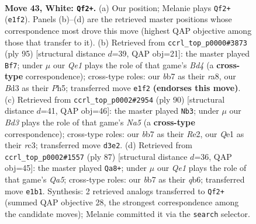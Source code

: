 \documentclass[11pt]{article}
\begin{document}
\clearpage

\begin{figure}[p]\centering
\begin{subfigure}{0.46\textwidth}\centering
\resizebox{\linewidth}{!}{%
\newchessgame
\chessboard[
  setfen={5r2/1b3k2/8/8/7p/3B3P/1p4P1/4Q1KR w - - 1 43},
  showmover=false,
  pgfstyle=straightmove, color=movearrow, markmove={e1-f2}
]}
\caption{}
\end{subfigure}\hfill
\begin{subfigure}{0.46\textwidth}\centering
\resizebox{\linewidth}{!}{%
\newchessgame
\chessboard[
  setfen={R7/8/p1r3k1/1p1b3p/8/P4P2/6PK/B7 b - - 13 48},
  showmover=false,
  pgfstyle=straightmove, color=movearrow, markmove={d5-f7}
]}
\caption{}
\end{subfigure}
\\[4pt]
\begin{subfigure}{0.46\textwidth}\centering
\resizebox{\linewidth}{!}{%
\newchessgame
\chessboard[
  setfen={8/4k3/4p1p1/N7/5bP1/2r2P2/P3RK2/8 w - - 3 46},
  showmover=false,
  pgfstyle=straightmove, color=movearrow, markmove={a5-b3}
]}
\caption{}
\end{subfigure}\hfill
\begin{subfigure}{0.46\textwidth}\centering
\resizebox{\linewidth}{!}{%
\newchessgame
\chessboard[
  setfen={4r3/8/1Q4pk/7p/q6P/6P1/8/5R1K b - - 0 44},
  showmover=false,
  pgfstyle=straightmove, color=movearrow, markmove={a4-a8}
]}
\caption{}
\end{subfigure}
\caption{\textbf{Move 43, White: \texttt{Qf2+}.} (a) Our position; Melanie plays \texttt{Qf2+} (\texttt{e1f2}). Panels (b)--(d) are the retrieved master positions whose correspondence most drove this move (highest QAP objective among those that transfer to it). (b) Retrieved from \texttt{ccrl\_top\_p0000\#3873} (ply 95) [structural distance $d$=39, QAP obj=21]: the master played \texttt{Bf7}; under $\mu$ our \emph{Qe1} plays the role of that game's \emph{Bd4} (a \textbf{cross-type} correspondence); cross-type roles: our \emph{b}b7 as their \emph{r}a8, our \emph{B}d3 as their \emph{P}h5; transferred move \texttt{e1f2} \textbf{(endorses this move)}. (c) Retrieved from \texttt{ccrl\_top\_p0002\#2954} (ply 90) [structural distance $d$=41, QAP obj=46]: the master played \texttt{Nb3}; under $\mu$ our \emph{Bd3} plays the role of that game's \emph{Na5} (a \textbf{cross-type} correspondence); cross-type roles: our \emph{b}b7 as their \emph{R}e2, our \emph{Q}e1 as their \emph{r}c3; transferred move \texttt{d3e2}. (d) Retrieved from \texttt{ccrl\_top\_p0002\#1557} (ply 87) [structural distance $d$=36, QAP obj=45]: the master played \texttt{Qa8+}; under $\mu$ our \emph{Qe1} plays the role of that game's \emph{Qa5}; cross-type roles: our \emph{b}b7 as their \emph{q}b6; transferred move \texttt{e1b1}. Synthesis: 2 retrieved analogs transferred to \texttt{Qf2+} (summed QAP objective 28, the strongest correspondence among the candidate moves); Melanie committed it via the \texttt{search} selector.}
\label{fig:thought-m84}
\end{figure}
\end{document}
